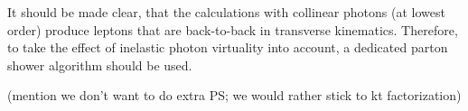 It should be made clear, that the calculations with collinear photons (at lowest order) produce leptons that are back-to-back in transverse kinematics. Therefore, to take the effect of inelastic photon virtuality into account, a dedicated parton shower algorithm should be used.

(mention we don't want to do extra PS; we would rather stick to kt factorization)
